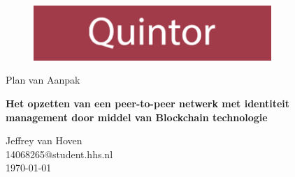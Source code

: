 \documentclass[a4paper,10pt]{report}
\begin{document}
  \begin{titlepage}
    \begin{figure}
      \centering
      \includegraphics[width=90mm]{quintor}
      \vspace{1cm}    
    \end{figure}

    {\huge\centering Plan van Aanpak \par}
    \vspace{1cm}    
    {\large\bfseries\centering
      Het opzetten van een peer-to-peer netwerk met identiteit \\
      management door middel van Blockchain technologie
    \par}

    \vfill

    \begin{flushleft}
      Jeffrey van Hoven \\
      14068265@student.hhs.nl \\
      \today
    \end{flushleft}
  \end{titlepage}

  \newpage
  \tableofcontents

  
  
  
  
  
  
  

    
  \setlength\bibsep{\baselineskip}  
  
\end{document}
